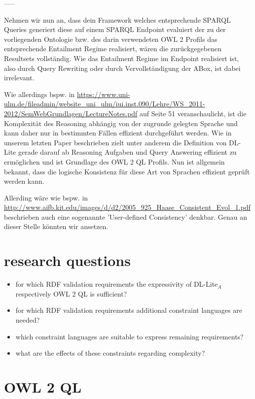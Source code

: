 \documentclass{llncs}
\begin{document}
-----

Nehmen wir nun an, dass dein Framework welches entsprechende SPARQL Queries generiert diese auf einem SPARQL Endpoint evaluiert der zu der vorliegenden Ontologie bzw. des darin verwendeten OWL 2 Profils das entsprechende Entailment Regime realisiert, wären die zurückgegebenen Resultsets vollständig. Wie das Entailment Regime im Endpoint realisiert ist, also durch Query Rewriting oder durch Vervollständigung der ABox, ist dabei irrelevant.

Wie allerdings bspw. in 
\url{https://www.uni-ulm.de/fileadmin/website_uni_ulm/iui.inst.090/Lehre/WS_2011-2012/SemWebGrundlagen/LectureNotes.pdf}
auf Seite 51 veranschaulicht, ist die Komplexität des Reasoning abhängig von der zugrunde gelegten Sprache und kann daher nur in bestimmten Fällen effizient durchgeführt werden. Wie in unserem letzten Paper beschrieben zielt unter anderem die Definition von DL-Lite gerade darauf ab Reasoning Aufgaben und Query Answering effizient zu ermöglichen und ist Grundlage des OWL 2 QL Profils. Nun ist allgemein bekannt, dass die logische Konsistenz für diese Art von Sprachen effizient geprüft werden kann. 

Allerding wäre wie bspw. in 
\url{http://www.aifb.kit.edu/images/d/d2/2005_925_Haase_Consistent_Evol_1.pdf} beschrieben auch eine sogenannte 'User-defined Consistency' denkbar. Genau an dieser Stelle könnten wir ansetzen.

\section{research questions}

\begin{itemize}
	\item for which RDF validation requirements the expressivity of DL-Lite$_A$ respectively OWL 2 QL is sufficient?
	\item for which RDF validation requirements additional constraint languages are needed?
	\item which constraint languages are suitable to express remaining requirements?
	\item what are the effects of these constraints regarding complexity?
\end{itemize}

\section{OWL 2 QL}
\end{document}
